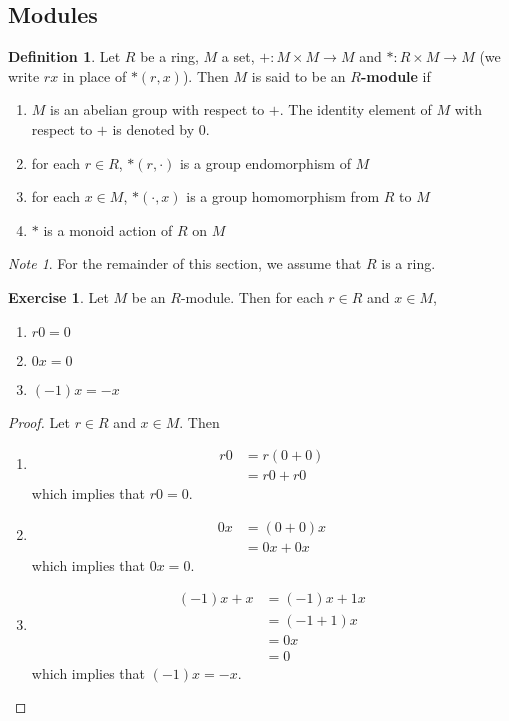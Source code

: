 \documentclass[12pt]{amsart}
\theoremstyle{definition}
\newtheorem{defn}[definition]{Definition}
\theoremstyle{remark}
\newtheorem{note}[remark]{Note}
\theoremstyle{definition}
\newtheorem{ex}[definition]{Exercise}
\begin{document}
	\subsection{Modules}
	
	\begin{defn}
	Let $R$ be a ring, $M$ a set, $+: M\times M \rightarrow M$ and $*: R 
	\times M \rightarrow M$ (we write $rx$ in place of 
	$*(r,x)$). Then $M$ is said to be an 
	\textbf{$R$-module}
	if 
	\begin{enumerate}
	\item $M$ is an abelian group with respect to $+$. The identity element of $M$ with respect to $+$ is denoted by 0.
	\item for each $r \in R$, $*(r, \cdot)$ is a group endomorphism of $M$
	\item for each $x \in M$, $*(\cdot, x)$ is a group homomorphism from $R$ to $M$
	\item $*$ is a monoid action of $R$ on $M$
	\end{enumerate}
	\end{defn}
	
	\begin{note}
	For the remainder of this section, we assume that $R$ is a ring. 
	\end{note}
	
	\newpage
	\begin{ex}
	Let $M$ be an $R$-module. Then for each $r \in R$ and $x \in M$, 
	\begin{enumerate}
	\item $r0 = 0$
	\item $0x = 0$
	\item $(-1)x = -x$
	\end{enumerate}
	\end{ex}
	
	\begin{proof} Let $r \in R$ and $x \in M$. Then 
	\begin{enumerate}
	\item 
	\begin{align*}
	r0 
	&= r(0+0) \\
	&= r0 + r0
	\end{align*} 
	which implies that $r0 = 0$.
	\item 
	\begin{align*}
	0x 
	&= (0+0)x \\
	&= 0x + 0x
	\end{align*} 
	which implies that $0x = 0$.
	\item 
	\begin{align*}
	(-1)x + x 
	&= (-1)x + 1x \\ 
	&= (-1 + 1)x \\
	&= 0x \\
	&= 0
	\end{align*}
	which implies that $(-1)x = -x$.
	\end{enumerate}
	\end{proof}
	
\end{document}
